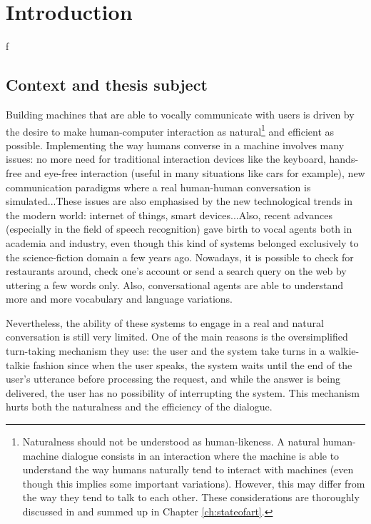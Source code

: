 \chapter*{Introduction}f

\section*{Context and thesis subject}

				Building machines that are able to vocally communicate with users is driven by the desire to make human-computer interaction as natural\footnote{Naturalness should not be understood as human-likeness. A natural human-machine dialogue consists in an interaction where the machine is able to understand the way humans naturally tend to interact with machines (even though this implies some important variations). However, this may differ from the way they tend to talk to each other. These considerations are thoroughly discussed in \cite{Edlund2008} and summed up in Chapter \ref{ch:stateofart}.} and efficient as possible. Implementing the way humans converse in a machine involves many issues: no more need for traditional interaction devices like the keyboard, hands-free and eye-free interaction (useful in many situations like cars for example), new communication paradigms where a real human-human conversation is simulated...These issues are also emphasised by the new technological trends in the modern world: internet of things, smart devices...Also, recent advances (especially in the field of speech recognition) gave birth to vocal agents both in academia and industry, even though this kind of systems belonged exclusively to the science-fiction domain a few years ago. Nowadays, it is possible to check for restaurants around, check one's account or send a search query on the web by uttering a few words only. Also, conversational agents are able to understand more and more vocabulary and language variations.
				
				Nevertheless, the ability of these systems to engage in a real and natural conversation is still very limited. One of the main reasons is the oversimplified turn-taking mechanism they use: the user and the system take turns in a walkie-talkie fashion since when the user speaks, the system waits until the end of the user's utterance before processing the request, and while the answer is being delivered, the user has no possibility of interrupting the system. This mechanism hurts both the naturalness and the efficiency of the dialogue.
				
